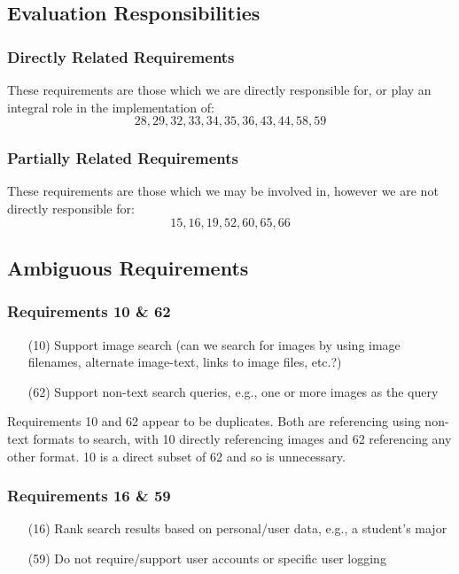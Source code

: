 \subsection*{Evaluation Responsibilities}
\subsubsection*{Directly Related Requirements}
These requirements are those which we are directly responsible for, or play an integral role in the implementation of:
$$ 28, 29, 32, 33, 34, 35, 36, 43, 44, 58, 59 $$
\subsubsection*{Partially Related Requirements}
These requirements are those which we may be involved in, however we are not directly responsible for:
$$ 15, 16, 19, 52, 60, 65, 66 $$

\subsection*{Ambiguous Requirements}
\subsubsection*{Requirements 10 \& 62}
\begin{itemize}
  \item[(10)] Support image search (can we search for images by using image filenames, alternate image-text, links to image files, etc.?)
  \item[(62)] Support non-text search queries, e.g., one or more images as the query
\end{itemize}

Requirements 10 and 62 appear to be duplicates. Both are referencing using non-text formats to search, with 10 directly referencing images and 62 referencing any other format. 10 is a direct subset of 62 and so is unnecessary.

\subsubsection*{Requirements 16 \& 59}
\begin{itemize}
  \item[(16)] Rank search results based on personal/user data, e.g., a student's major
  \item[(59)] Do not require/support user accounts or specific user logging
\end{itemize}

